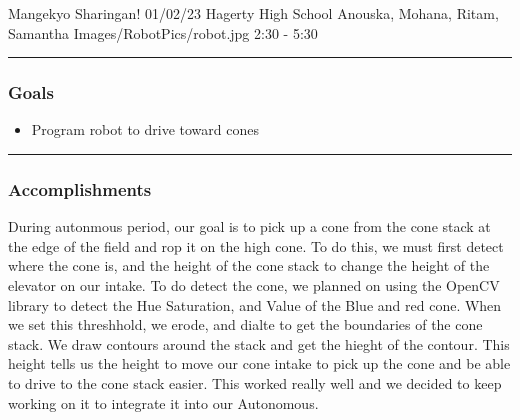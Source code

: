 \insertmeeting 
{Mangekyo Sharingan!} 
{01/02/23} 
{Hagerty High School}
{Anouska, Mohana, Ritam, Samantha}
{Images/RobotPics/robot.jpg}
{2:30 - 5:30}

\noindent\hfil\rule{\textwidth}{.4pt}\hfil
\subsubsection*{Goals}
\begin{itemize}
    \item Program robot to drive toward cones

\end{itemize} 

\noindent\hfil\rule{\textwidth}{.4pt}\hfil

\subsubsection*{Accomplishments}
During autonmous period, our goal is to pick up a cone from the cone stack at the edge of the field and rop it on the high cone. To do this, we must first detect where the cone is, and the height of the cone stack to change the height of the elevator on our intake. To do detect the cone, we planned on using the OpenCV library to detect the Hue Saturation, and Value of the Blue and red cone. When we set this threshhold, we erode, and dialte to get the boundaries of the cone stack. We draw contours around the stack and get the hieght of the contour. This height tells us the height to move our cone intake to pick up the cone and be able to drive to the cone stack easier. This worked really well and we decided to keep working on it to integrate it into our Autonomous. 

